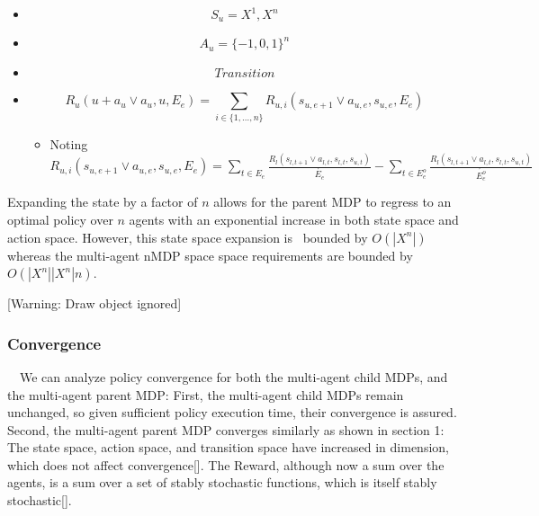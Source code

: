 \documentclass{article}
\begin{document}
\begin{itemize}
\item \begin{equation*}
S_u=X^1,X^n
\end{equation*}
\item \begin{equation*}
A_u=\{-1,0,1\}^n
\end{equation*}
\item \begin{equation*}
\mathit{Transition}
\end{equation*}
\item \begin{equation*}
R_u\left(u+a_u\vee a_u,u,E_e\right)=\sum _{i{\in}\{1,{\dots},n\}}^{}R_{u,i}\left(s_{u,e+1}\vee a_{u,e},s_{u,e},E_e\right)
\end{equation*}
\begin{itemize}
\item Noting  $R_{u,i}\left(s_{u,e+1}\vee a_{u,e},s_{u,e},E_e\right)=\sum _{t{\in}E_e}^{}\frac{R_l\left(s_{l,t+1}\vee a_{l,t},s_{l,t},s_{u,t}\right)}{\acute{E_e}}-\sum _{t{\in}E_e^o}^{}\frac{R_l\left(s_{l,t+1}\vee a_{l,t},s_{l,t},s_{u,t}\right)}{\acute{E_e^o}}$
\end{itemize}
\end{itemize}
Expanding the state by a factor of  $n$ allows for the parent MDP to regress to an optimal policy over  $n$ agents with an exponential increase in both state space and action space. However, this state space expansion is \ bounded by  $O(\left|X^n\right|)$ whereas the multi-agent nMDP space space requirements are bounded by  $O(\left|X^n\right|\left|X^n\right|n)$. 

[Warning: Draw object ignored]

\subsubsection{Convergence}
\ \ We can analyze policy convergence for both the multi-agent child MDPs, and the multi-agent parent MDP: First, the multi-agent child MDPs remain unchanged, so given sufficient policy execution time, their convergence is assured. Second, the multi-agent parent MDP converges similarly as shown in section 1: The state space, action space, and transition space have increased in dimension, which does not affect convergence[]. The Reward, although now a sum over the agents, is a sum over a set of stably stochastic functions, which is itself stably stochastic[].
\end{document}
